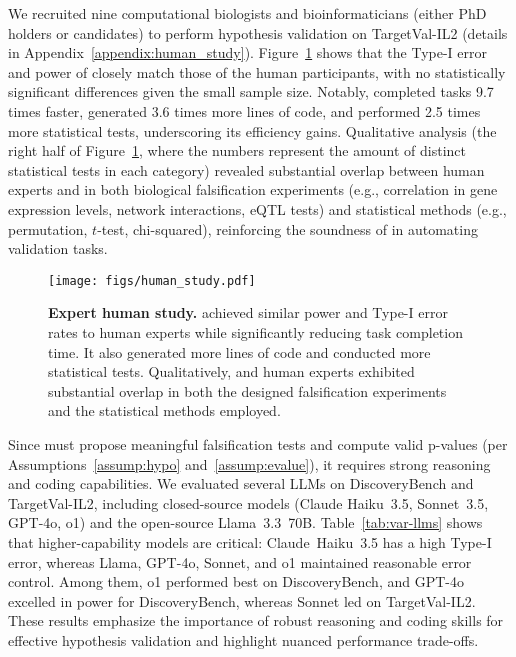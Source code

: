 \vspace{-0.5em}

We recruited nine computational biologists and bioinformaticians (either PhD holders or candidates) to perform hypothesis validation on TargetVal-IL2 (details in Appendix~\ref{appendix:human_study}). 
Figure~\ref{fig:human_study} shows that the Type-I error and power of \mname closely match those of the human participants, with no statistically significant differences given the small sample size. 
Notably, \mname completed tasks 9.7 times faster, generated 3.6 times more lines of code, and performed 2.5 times more statistical tests, underscoring its efficiency gains. 
Qualitative analysis (the right half of Figure~\ref{fig:human_study}, where the numbers represent the amount of distinct statistical tests in each category) revealed substantial overlap between human experts and \mname in both biological falsification experiments (e.g., correlation in gene expression levels, network interactions, eQTL tests) and statistical methods (e.g., permutation, $t$-test, chi-squared), reinforcing the soundness of \mname in automating validation tasks.


\begin{figure}[!t]
\captionsetup{font=small}
    \centering
    \texttt{[image: figs/human\_study.pdf]}
    \vspace{-8mm}
    \caption{
    \textbf{Expert human study.}
\mname achieved similar power and Type-I error rates to human experts while significantly reducing task completion time.
It also generated more lines of code and conducted more statistical tests.
Qualitatively, \mname and human experts exhibited substantial overlap in both the designed falsification experiments and the statistical methods employed.
    }
    \label{fig:human_study}
\end{figure}


\vspace{-0.5em}
Since \mname must propose meaningful falsification tests and compute valid p-values (per Assumptions~\ref{assump:hypo} and~\ref{assump:evalue}), it requires strong reasoning and coding capabilities. We evaluated several LLMs on DiscoveryBench and TargetVal-IL2, including closed-source models (Claude Haiku~3.5, Sonnet~3.5, GPT-4o, o1) and the open-source Llama~3.3~70B. Table~\ref{tab:var-llms} shows that higher-capability models are critical: Claude~Haiku~3.5 has a high Type-I error, whereas Llama, GPT-4o, Sonnet, and o1 maintained reasonable error control. Among them, o1 performed best on DiscoveryBench, and GPT-4o excelled in power for DiscoveryBench, whereas Sonnet led on TargetVal-IL2. These results emphasize the importance of robust reasoning and coding skills for effective hypothesis validation and highlight nuanced performance trade-offs.


